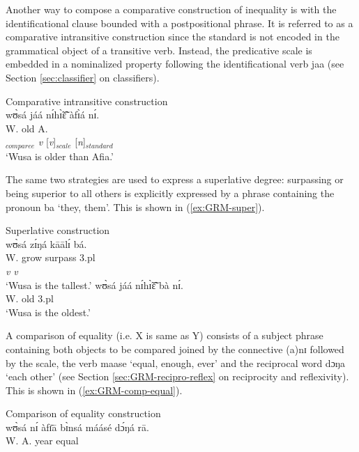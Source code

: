 \z 
 \z

Another way to compose a comparative construction of inequality is with the
identificational clause bounded with a postpositional phrase.  It is referred
to as a
comparative intransitive construction since the standard is not encoded in the
grammatical object of a transitive verb. Instead, the predicative scale is
embedded in a nominalized property following the identificational verb {\sls 
jaa}
(see Section \ref{sec:classifier} on classifiers).


\ea\label{ex:GRM}{\rm Comparative intransitive construction}\\

\glll wʊ̀sá jáá nɪ́hɪ̃̀ɛ̃̂ àfɪ̀á nɪ́.\\
W.  {\ident} old A. {\postp}\\
[{\it n}]$_{comparee}$   {\it v} [{\it v}]$_{scale}$  [{\it n}]$_{standard}$  
{}\\
\glt `Wusa is older than Afia.'
\z

The same  two strategies are used to
express a superlative degree: surpassing or being superior to all others is
explicitly expressed by a phrase containing the pronoun {\sls ba} `they, them'.
This
is shown in (\ref{ex:GRM-super}).


\ea\label{ex:GRM-super}{\rm Superlative construction}\\

\ea
\glll wʊ̀sá zɪ́ŋá kāālɪ́ bá.\\
W. grow surpass {\sc 3.pl}\\
{} {\it v} {\it v} {}\\
\glt  `Wusa is the tallest.'
\ex 
\gll wʊ̀sá jáá nɪ́hɪ̃̀ɛ̃̂ bà nɪ́.\\
W. {\ident} old {\sc 3.pl} {\postp}\\
\glt  `Wusa is the oldest.'

\z 
 \z

A comparison of equality (i.e. X is same as Y) consists of a subject
phrase containing both objects to be  compared joined by the  connective {\sls 
(a)nɪ} followed by the scale, the verb {\sls maase} `equal, enough, ever' and 
the
reciprocal word {\sls dɔŋa} `each other'  (see Section 
\ref{sec:GRM-recipro-reflex} on reciprocity
 and reflexivity). This is shown in (\ref{ex:GRM-comp-equal}).

\ea\label{ex:GRM-comp-equal}{\rm  Comparison of equality construction}\\

\gll wʊ̀sá nɪ́ àfɪ̄ā bɪ̀nsá máásé dɔ́ŋá rā.\\
W. {\conn} A.  year equal {\recp} {\foc}\\

